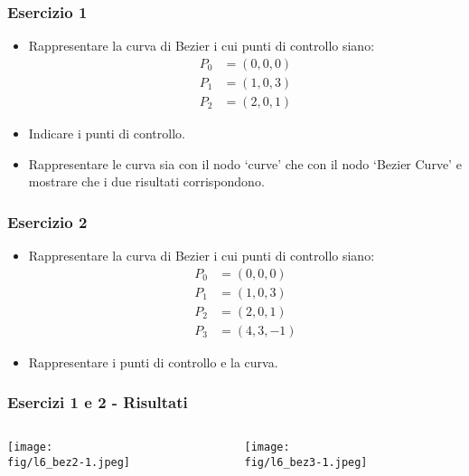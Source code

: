 \documentclass{beamer}
\newcommand{\fig}{./figures} %
\newenvironment{myblock}[3]{%
\definecolor{smtbx}{rgb}{0.64,0.76,0.68}
\setbeamercolor{block body}{#2}
\setbeamercolor{block title}{#3}
\begin{block}{#1}}{\end{block}}
\begin{document}
%
\begin{frame}
\frametitle{Esercizio 1}
\begin{itemize}
\item Rappresentare la curva di Bezier i cui punti di controllo siano:
\begin{align}
P_0 &= (0,0,0)\\
P_1 &= (1,0,3)\\
P_2 &= (2,0,1)
\end{align}
\item Indicare i punti di controllo.
\item Rappresentare le curva sia con il nodo `curve' che con il nodo  `Bezier Curve' e mostrare che i due risultati corrispondono.
\end{itemize}
\end{frame}
%
\begin{frame}
\frametitle{Esercizio 2 }
\begin{itemize}
\item Rappresentare la curva di Bezier i cui punti di controllo siano:
\begin{align}
P_0 &= (0,0,0) \\
P_1 &= (1,0,3)\\
P_2 &= (2,0,1)\\
P_3 &= (4,3,-1)
\end{align}
\item Rappresentare i punti di controllo e la curva.
\end{itemize}
\end{frame}
\begin{frame}[fragile]
\frametitle{Esercizi 1 e 2 - Risultati}
\begin{columns}
\begin{column}{0.5\textwidth}
\texttt{[image: \\fig/l6\_bez2-1.jpeg]}
\end{column}
\begin{column}{0.5\textwidth}
\texttt{[image: \\fig/l6\_bez3-1.jpeg]}
\end{column}
\end{columns}
\end{frame}
\end{document}
